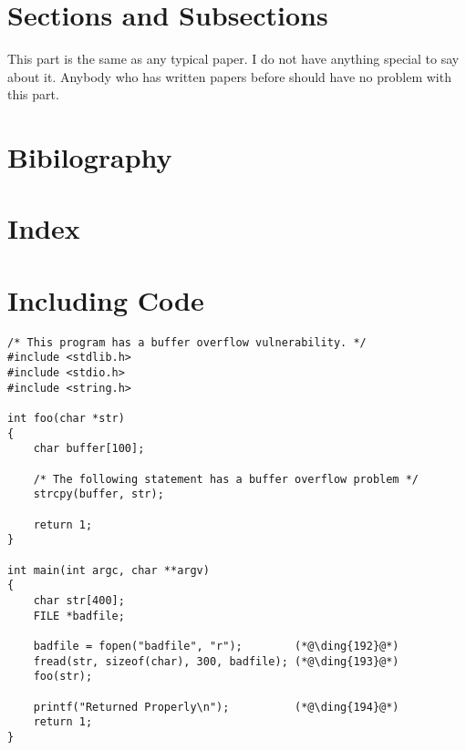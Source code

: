 \section{Sections and Subsections} 

This part is the same as any typical paper. I do not have anything special
to say about it. Anybody who has written papers before should have no problem with 
this part.




\section{Bibilography}




\section{Index}




\section{Including Code}



\begin{lstlisting}[caption={The vulnerable program (\texttt{stack.c})},
                   label={buffer:stack_program}]
/* This program has a buffer overflow vulnerability. */
#include <stdlib.h>
#include <stdio.h>
#include <string.h>

int foo(char *str)
{
    char buffer[100];

    /* The following statement has a buffer overflow problem */
    strcpy(buffer, str);

    return 1;
}

int main(int argc, char **argv)
{
    char str[400];
    FILE *badfile;

    badfile = fopen("badfile", "r");        (*@\ding{192}@*)
    fread(str, sizeof(char), 300, badfile); (*@\ding{193}@*)
    foo(str);

    printf("Returned Properly\n");          (*@\ding{194}@*)
    return 1;
}
\end{lstlisting}
 

